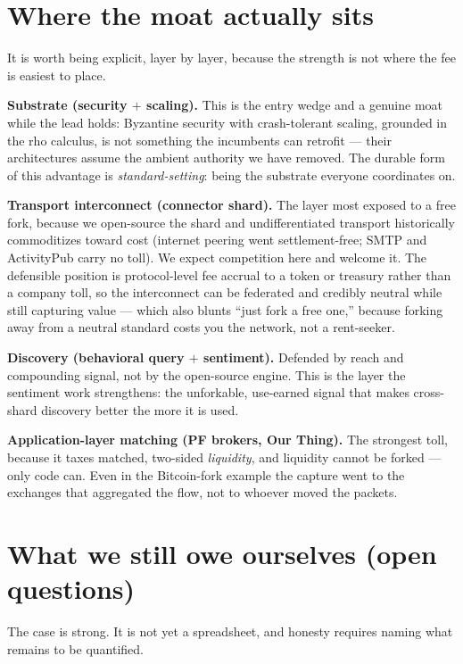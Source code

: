 \documentclass[11pt]{article}
\begin{document}
\section{Where the moat actually sits}

It is worth being explicit, layer by layer, because the strength is not where the fee is easiest to place.

\textbf{Substrate (security $+$ scaling).} This is the entry wedge and a genuine moat while the lead holds: Byzantine security with crash-tolerant scaling, grounded in the rho calculus, is not something the incumbents can retrofit --- their architectures assume the ambient authority we have removed. The durable form of this advantage is \emph{standard-setting}: being the substrate everyone coordinates on.

\textbf{Transport interconnect (connector shard).} The layer most exposed to a free fork, because we open-source the shard and undifferentiated transport historically commoditizes toward cost (internet peering went settlement-free; SMTP and ActivityPub carry no toll). We expect competition here and welcome it. The defensible position is protocol-level fee accrual to a token or treasury rather than a company toll, so the interconnect can be federated and credibly neutral while still capturing value --- which also blunts ``just fork a free one,'' because forking away from a neutral standard costs you the network, not a rent-seeker.

\textbf{Discovery (behavioral query $+$ sentiment).} Defended by reach and compounding signal, not by the open-source engine. This is the layer the sentiment work strengthens: the unforkable, use-earned signal that makes cross-shard discovery better the more it is used.

\textbf{Application-layer matching (PF brokers, Our Thing).} The strongest toll, because it taxes matched, two-sided \emph{liquidity}, and liquidity cannot be forked --- only code can. Even in the Bitcoin-fork example the capture went to the exchanges that aggregated the flow, not to whoever moved the packets.

\section{What we still owe ourselves (open questions)}

The case is strong. It is not yet a spreadsheet, and honesty requires naming what remains to be quantified.
\end{document}
